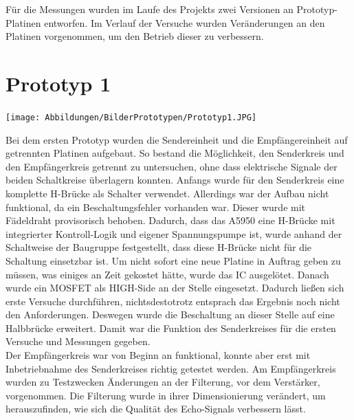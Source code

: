 Für die Messungen wurden im Laufe des Projekts zwei Versionen an Prototyp-Platinen entworfen. Im Verlauf der Versuche wurden Veränderungen an den Platinen vorgenommen, um den Betrieb dieser zu verbessern. 
\section{Prototyp 1}
\begin{center}
\begin{minipage}{0.75\textwidth}
\texttt{[image: Abbildungen/BilderPrototypen/Prototyp1.JPG]}
\label{fig:Prototyp1}
\end{minipage}
\end{center}
Bei dem ersten Prototyp wurden die Sendereinheit und die Empfängereinheit auf getrennten Platinen aufgebaut. So bestand die Möglichkeit, den Senderkreis und den Empfängerkreis getrennt zu untersuchen, ohne dass elektrische Signale der beiden Schaltkreise überlagern konnten. Anfangs wurde für den Senderkreis eine komplette H-Brücke als Schalter verwendet. Allerdings war der Aufbau nicht funktional, da ein Beschaltungsfehler vorhanden war. Dieser wurde mit Fädeldraht provisorisch behoben.  Dadurch, dass das A5950 eine H-Brücke mit integrierter Kontroll-Logik und eigener Spannungspumpe ist, wurde anhand der Schaltweise der Baugruppe festgestellt, dass diese H-Brücke nicht für die Schaltung einsetzbar ist. Um nicht sofort eine neue Platine in Auftrag geben zu müssen, was einiges an Zeit gekostet hätte, wurde das IC ausgelötet. Danach wurde ein MOSFET als HIGH-Side an der Stelle eingesetzt. Dadurch ließen sich erste Versuche durchführen, nichtsdestotrotz entsprach das Ergebnis noch nicht den Anforderungen. Deswegen wurde die Beschaltung an dieser Stelle auf eine Halbbrücke erweitert. Damit war die Funktion des Senderkreises für die ersten Versuche und Messungen gegeben.\\
Der Empfängerkreis war von Beginn an funktional, konnte aber erst mit Inbetriebnahme des Senderkreises richtig getestet werden. Am Empfängerkreis wurden zu Testzwecken Änderungen an der Filterung, vor dem Verstärker, vorgenommen. Die Filterung wurde in ihrer Dimensionierung verändert, um herauszufinden, wie sich die Qualität des Echo-Signals verbessern lässt.\\

